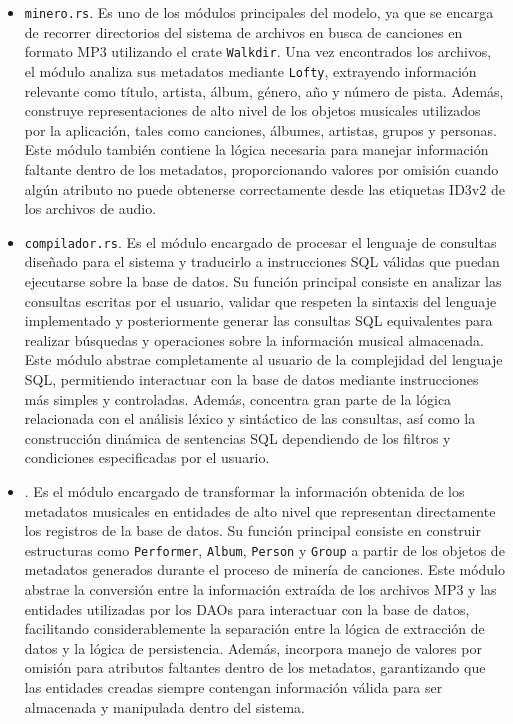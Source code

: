 \documentclass[12pt]{article}
\begin{document}
\begin{itemize}
  
\item \texttt{minero.rs}. Es uno de los módulos principales del modelo, ya que se encarga de recorrer directorios del sistema de archivos en busca de canciones en formato MP3 utilizando el crate \texttt{Walkdir}. Una vez encontrados los archivos, el módulo analiza sus metadatos mediante \texttt{Lofty}, extrayendo información relevante como título, artista, álbum, género, año y número de pista. Además, construye representaciones de alto nivel de los objetos musicales utilizados por la aplicación, tales como canciones, álbumes, artistas, grupos y personas. Este módulo también contiene la lógica necesaria para manejar información faltante dentro de los metadatos, proporcionando valores por omisión cuando algún atributo no puede obtenerse correctamente desde las etiquetas ID3v2 de los archivos de audio.

  \item \texttt{compilador.rs}. Es el módulo encargado de procesar el lenguaje de consultas diseñado para el sistema y traducirlo a instrucciones SQL válidas que puedan ejecutarse sobre la base de datos. Su función principal consiste en analizar las consultas escritas por el usuario, validar que respeten la sintaxis del lenguaje implementado y posteriormente generar las consultas SQL equivalentes para realizar búsquedas y operaciones sobre la información musical almacenada. Este módulo abstrae completamente al usuario de la complejidad del lenguaje SQL, permitiendo interactuar con la base de datos mediante instrucciones más simples y controladas. Además, concentra gran parte de la lógica relacionada con el análisis léxico y sintáctico de las consultas, así como la construcción dinámica de sentencias SQL dependiendo de los filtros y condiciones especificadas por el usuario.

    \item \texttt{}. Es el módulo encargado de transformar la información obtenida de los metadatos musicales en entidades de alto nivel que representan directamente los registros de la base de datos. Su función principal consiste en construir estructuras como \texttt{Performer}, \texttt{Album}, \texttt{Person} y \texttt{Group} a partir de los objetos de metadatos generados durante el proceso de minería de canciones. Este módulo abstrae la conversión entre la información extraída de los archivos MP3 y las entidades utilizadas por los DAOs para interactuar con la base de datos, facilitando considerablemente la separación entre la lógica de extracción de datos y la lógica de persistencia. Además, incorpora manejo de valores por omisión para atributos faltantes dentro de los metadatos, garantizando que las entidades creadas siempre contengan información válida para ser almacenada y manipulada dentro del sistema.


\end{itemize}
\end{document}

